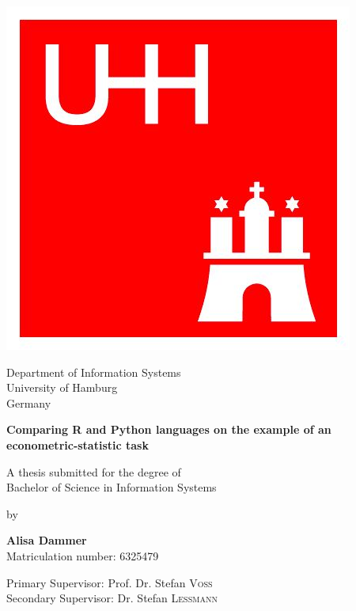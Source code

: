 \documentclass[
  twoside,
  11pt, a4paper,
  footinclude=true,
  headinclude=true,
  cleardoublepage=empty
]{scrreprt}
\begin{document}
    
    \begin{titlepage}
        \begin{center}
            
            \vspace{-1.5cm}
            
            \includegraphics[scale=0.75]{logo_uhh.jpg}
           
            Department of Information Systems\\
            University of Hamburg\\
            Germany\\
    
            \vspace{2.5cm}
            
            \LARGE
            \textbf{Comparing R and Python languages on the example of an econometric-statistic task }
            
            \vspace{2.5cm}
            
            \normalsize
            A thesis submitted for the degree of\\
            Bachelor of Science in Information Systems

            
            \vspace{0.6cm}
    
            by
    
            \vspace{0.6cm}
            
            \large
            \textbf{Alisa Dammer}\\
            {\small Matriculation number: 6325479}
            
            \vspace{2.5cm}

            \large
            Primary Supervisor: Prof. Dr. Stefan \textsc{Voß}\\
            Secondary Supervisor: Dr. Stefan \textsc{Lessmann}
            
        \end{center}
    \end{titlepage}
\end{document}
